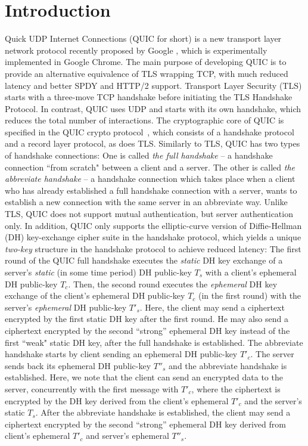 \section{Introduction} \label{sec:intro}
Quick UDP Internet Connections (QUIC for short) is a
new transport layer network protocol recently proposed by Google \cite{QUIC,QUICDraft}, 
which is experimentally implemented in Google Chrome. 
The main purpose of developing QUIC is to provide an alternative equivalence of TLS wrapping TCP, 
with much reduced latency and better SPDY and HTTP/2 support. 
Transport Layer Security (TLS) starts with a three-move TCP handshake 
before initiating the TLS Handshake Protocol.
In contrast, QUIC uses UDP and starts with its own handshake, 
which reduces the total number of interactions.
The cryptographic core of QUIC is specified in the QUIC crypto protocol~\cite{QUIC:Crypto}, 
which consists of a handshake protocol and a record layer protocol, as does TLS.
Similarly to TLS, QUIC has two types of handshake connections: 
One is called \textit{the full handshake} -- a handshake connection 
``from scratch" between a client and a server. 
The other is called \textit{the abbreviate handshake} -- a handshake connection 
which takes place when a client who has already established a full handshake connection with a server, 
wants to establish a new connection with the same server in an abbreviate way. 
Unlike TLS, QUIC does not support mutual authentication, but server authentication only. 
In addition, QUIC only supports the elliptic-curve version of Diffie-Hellman (DH) key-exchange cipher suite 
in the handshake protocol,  which yields a unique \textit{two-key} structure in the handshake protocol   
to achieve reduced latency:  
The first round of the QUIC full handshake executes the \textit{static} DH key exchange of  
a server's \textit{static} (in some time period) DH public-key $T_s$ 
with a client's ephemeral DH public-key $T_c$. 
Then, the second round executes the \textit{ephemeral} DH key exchange of 
the client's ephemeral DH public-key $T_c$ (in the first round) with 
the server's \textit{ephemeral} DH public-key $T'_s$.
Here, the client may send a ciphertext encrypted by the first static DH key after the first round. 
He may also send a ciphertext encrypted by the second ``strong'' ephemeral DH key 
instead of the first ``weak" static DH key, after the full handshake is established. 
The abbreviate handshake starts by client sending an ephemeral DH public-key $T'_c$. 
The server sends back its ephemeral DH public-key $T''_s$ and the abbreviate handshake is established. 
Here, we note that the client can send an encrypted data to the server, 
concurrently with the first message with $T'_c$, where 
the ciphertext is encrypted by the DH key derived from  
the client's ephemeral $T'_c$ and the server's static $T_s$. 
After the abbreviate handshake is established, 
the client may send a ciphertext encrypted by the second ``strong'' ephemeral DH key 
derived from client's ephemeral $T'_c$ and server's ephemeral $T''_s$.

